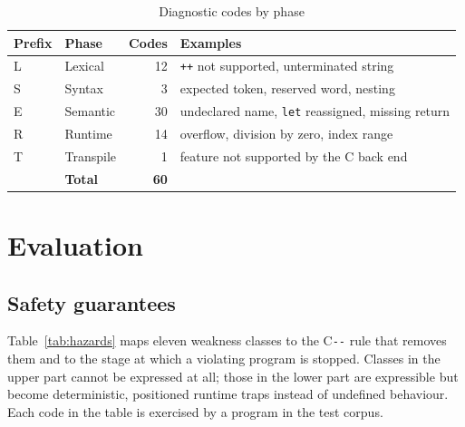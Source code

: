 \documentclass[conference]{IEEEtran}
\newcommand{\cmm}{C\texttt{-{}-}}
\begin{document}
\begin{table}[t]
\caption{Diagnostic codes by phase}
\label{tab:codes}
\centering
\footnotesize
\begin{tabular}{@{}l l r >{\raggedright\arraybackslash}p{3.85cm}@{}}
\toprule
\textbf{Prefix} & \textbf{Phase} & \textbf{Codes} & \textbf{Examples} \\
\midrule
L & Lexical      & 12 & \texttt{++} not supported, unterminated string \\
S & Syntax       & 3  & expected token, reserved word, nesting \\
E & Semantic     & 30 & undeclared name, \texttt{let} reassigned, missing return \\
R & Runtime      & 14 & overflow, division by zero, index range \\
T & Transpile    & 1  & feature not supported by the C back end \\
\midrule
  & \textbf{Total} & \textbf{60} & \\
\bottomrule
\end{tabular}
\end{table}



\section{Evaluation}\label{sec:eval}
\subsection{Safety guarantees}
Table~\ref{tab:hazards} maps eleven weakness classes to the \cmm{} rule that removes them and to the stage at
which a violating program is stopped. Classes in the upper part cannot be expressed at all; those in the lower
part are expressible but become deterministic, positioned runtime traps instead of undefined behaviour. Each
code in the table is exercised by a program in the test corpus.
\end{document}
